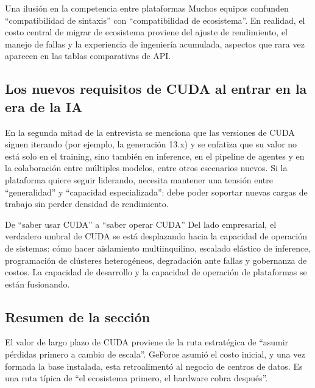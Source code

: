 \begin{warningbox}{Una ilusión en la competencia entre plataformas}
Muchos equipos confunden ``compatibilidad de sintaxis'' con ``compatibilidad de ecosistema''. En realidad, el costo central de migrar de ecosistema proviene del ajuste de rendimiento, el manejo de fallas y la experiencia de ingeniería acumulada, aspectos que rara vez aparecen en las tablas comparativas de API.
\end{warningbox}

\subsection{Los nuevos requisitos de CUDA al entrar en la era de la IA}

En la segunda mitad de la entrevista se menciona que las versiones de CUDA siguen iterando (por ejemplo, la generación 13.x) y se enfatiza que su valor no está solo en el training, sino también en inference, en el pipeline de agentes y en la colaboración entre múltiples modelos, entre otros escenarios nuevos. Si la plataforma quiere seguir liderando, necesita mantener una tensión entre ``generalidad'' y ``capacidad especializada'': debe poder soportar nuevas cargas de trabajo sin perder densidad de rendimiento.

\begin{knowledgebox}{De ``saber usar CUDA'' a ``saber operar CUDA''}
Del lado empresarial, el verdadero umbral de CUDA se está desplazando hacia la capacidad de operación de sistemas: cómo hacer aislamiento multiinquilino, escalado elástico de inference, programación de clústeres heterogéneos, degradación ante fallas y gobernanza de costos. La capacidad de desarrollo y la capacidad de operación de plataformas se están fusionando.
\end{knowledgebox}

\subsection{Resumen de la sección}

El valor de largo plazo de CUDA proviene de la ruta estratégica de ``asumir pérdidas primero a cambio de escala''. GeForce asumió el costo inicial, y una vez formada la base instalada, esta retroalimentó al negocio de centros de datos. Es una ruta típica de ``el ecosistema primero, el hardware cobra después''.
